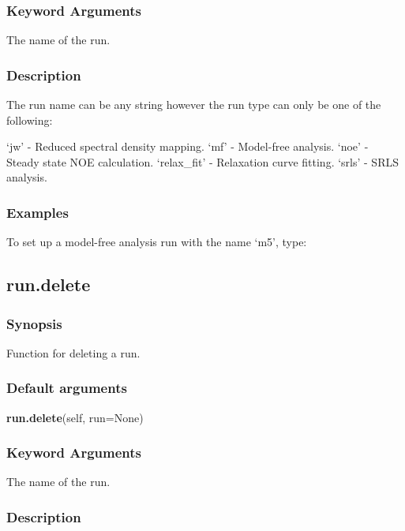 \subsubsection{Keyword Arguments}

  The name of the run.


\subsubsection{Description}

The run name can be any string however the run type can only be one of the following:

    `jw' - Reduced spectral density mapping.
    `mf' - Model-free analysis.
    `noe' - Steady state NOE calculation.
    `relax\_fit' - Relaxation curve fitting.
    `srls' - SRLS analysis.


\subsubsection{Examples}

To set up a model-free analysis run with the name `m5', type:




\newpage

\subsection{run.delete}


\subsubsection{Synopsis}

Function for deleting a run.

\subsubsection{Default arguments}

\textsf{\textbf{run.delete}(self, run=None)}


\subsubsection{Keyword Arguments}

  The name of the run.

\subsubsection{Description}

